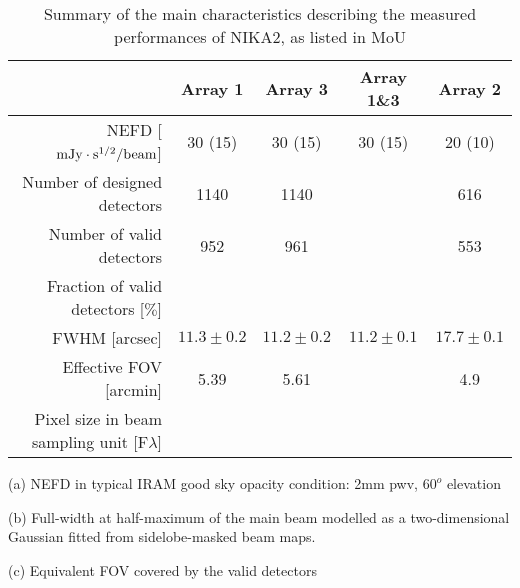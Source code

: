 \begin{table}[h]
  \caption[Main performance requirement]{Summary of the main characteristics describing the measured performances of NIKA2, as listed in MoU}
  \label{nika2summary_main}
  \begin{threeparttable}
    \begin{tabular}{|r|c|c|c|c|}
      \hline
      & Array 1 & Array 3  & Array 1\&3 & Array 2 \\
      \hline
      \hline
      NEFD\tnote{a}\hspace{1mm}   [$\rm{mJy} \cdot \rm{s}^{1/2}/\rm{beam}$]  &  30 (15)   & 30 (15)  &  30 (15)  & 20 (10) \\
      Number of designed detectors       & 1140      &  1140    &    &    616  \\
      Number of valid detectors          &  952      &   961    &    &    553  \\
      Fraction of valid detectors [$\%$] &           &          &    &         \\
      \hline
      FWHM\tnote{b}\hspace{1mm} [arcsec]  &  $11.3 \pm 0.2$   &  $11.2 \pm 0.2$  &   $11.2 \pm 0.1$  &  $17.7 \pm 0.1$ \\
      \hline
      Effective FOV\tnote{c}\hspace{1mm} [arcmin]    &   5.39    &   5.61    &    &   4.9  \\
      \hline
      Pixel size in beam sampling unit [F$\lambda$]  &    &   &    &   \\
      \hline      
\end{tabular}
  \begin{tablenotes}
  \item[(a)] NEFD in typical IRAM good sky opacity condition: 2mm pwv, $60^o$ elevation
  \item[(b)] Full-width at half-maximum of the main beam modelled as a two-dimensional Gaussian fitted from sidelobe-masked beam maps.
  \item[(c)] Equivalent FOV covered by the valid detectors
    \end{tablenotes}
\end{threeparttable}
\end{table} 



